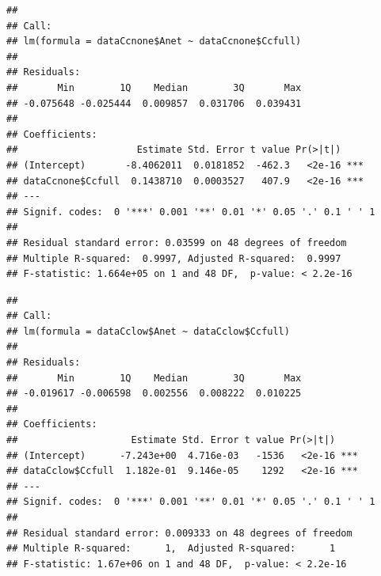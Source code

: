 \documentclass[
]{krantz}
\makeatletter
\newenvironment{Shaded}{\begin{snugshade}}{\end{snugshade}}
\newcommand{\DecValTok}[1]{\textcolor[rgb]{0.00,0.00,0.81}{#1}}
\newcommand{\KeywordTok}[1]{\textcolor[rgb]{0.13,0.29,0.53}{\textbf{#1}}}
\newcommand{\NormalTok}[1]{#1}
\newcommand{\OperatorTok}[1]{\textcolor[rgb]{0.81,0.36,0.00}{\textbf{#1}}}
\newcommand{\StringTok}[1]{\textcolor[rgb]{0.31,0.60,0.02}{#1}}
\newenvironment{kframe}{%
\medskip{}
\setlength{\fboxsep}{.8em}
 \def\at@end@of@kframe{}%
 \ifinner\ifhmode%
  \def\at@end@of@kframe{\end{minipage}}%
  \begin{minipage}{\columnwidth}%
 \fi\fi%
 \def\FrameCommand##1{\hskip\@totalleftmargin \hskip-\fboxsep
 \colorbox{shadecolor}{##1}\hskip-\fboxsep
     \hskip-\linewidth \hskip-\@totalleftmargin \hskip\columnwidth}%
 \MakeFramed {\advance\hsize-\width
   \@totalleftmargin\z@ \linewidth\hsize
   \@setminipage}}%
 {\par\unskip\endMakeFramed%
 \at@end@of@kframe}
\renewenvironment{Shaded}{\begin{kframe}}{\end{kframe}}
\makeatother
\begin{document}
\begin{verbatim}
## 
## Call:
## lm(formula = dataCcnone$Anet ~ dataCcnone$Ccfull)
## 
## Residuals:
##       Min        1Q    Median        3Q       Max 
## -0.075648 -0.025444  0.009857  0.031706  0.039431 
## 
## Coefficients:
##                     Estimate Std. Error t value Pr(>|t|)    
## (Intercept)       -8.4062011  0.0181852  -462.3   <2e-16 ***
## dataCcnone$Ccfull  0.1438710  0.0003527   407.9   <2e-16 ***
## ---
## Signif. codes:  0 '***' 0.001 '**' 0.01 '*' 0.05 '.' 0.1 ' ' 1
## 
## Residual standard error: 0.03599 on 48 degrees of freedom
## Multiple R-squared:  0.9997, Adjusted R-squared:  0.9997 
## F-statistic: 1.664e+05 on 1 and 48 DF,  p-value: < 2.2e-16
\end{verbatim}

\begin{Shaded}
\end{Shaded}

\begin{verbatim}
## 
## Call:
## lm(formula = dataCclow$Anet ~ dataCclow$Ccfull)
## 
## Residuals:
##       Min        1Q    Median        3Q       Max 
## -0.019617 -0.006598  0.002556  0.008222  0.010225 
## 
## Coefficients:
##                    Estimate Std. Error t value Pr(>|t|)    
## (Intercept)      -7.243e+00  4.716e-03   -1536   <2e-16 ***
## dataCclow$Ccfull  1.182e-01  9.146e-05    1292   <2e-16 ***
## ---
## Signif. codes:  0 '***' 0.001 '**' 0.01 '*' 0.05 '.' 0.1 ' ' 1
## 
## Residual standard error: 0.009333 on 48 degrees of freedom
## Multiple R-squared:      1,  Adjusted R-squared:      1 
## F-statistic: 1.67e+06 on 1 and 48 DF,  p-value: < 2.2e-16
\end{verbatim}

\begin{Shaded}
\end{Shaded}
\end{document}

